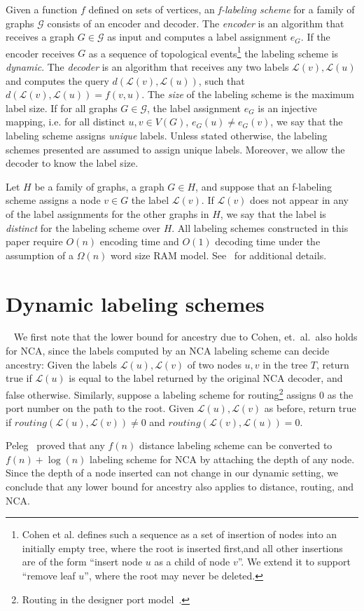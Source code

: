 \documentclass{llncs}
\newcommand{\la}{\ensuremath{ \mathcal{L}}}
\newcommand{\drop}[1]{}
\begin{document}
	Given a function $f$ defined on sets of vertices,
	 an  \emph{ f-labeling scheme} for a family of graphs $\mathcal{G}$ consists   of  an encoder  and decoder.
	The  \emph{encoder}  is an algorithm that receives a graph $G \in
    \mathcal{G}$ as input and  computes a label assignment $e_G$. If the encoder receives $G$ as a sequence of topological events\footnote{Cohen et al. defines such a sequence as  a set of insertion of nodes into an initially empty tree, where the root is inserted first,and all other insertions are of the form ``insert node $u$ as a child of node $v$''.  We extend it to support ``remove leaf $u$'', where the root may never be deleted. } the labeling scheme is \emph{dynamic}.
	 The \emph{decoder}  is an algorithm  that receives any two labels $\la(v),\la(u)$  and  computes the query $d(\la(v),\la(u))$, such that  $d(\la(v),\la(u))=f(v,u)$. The \emph{size} of the labeling scheme is the maximum label size.
	 If for all graphs  $ G \in \mathcal{G}$, the label assignment  $e_G$ is an injective mapping, i.e. for all distinct $u,v \in V(G)$, $e_G(u) \neq e_G(v) $, we say that the labeling scheme assigns \emph{unique} labels. Unless stated otherwise, the labeling schemes presented are assumed to assign unique labels. Moreover, we allow the decoder to know the label size.

	 Let $H$ be a family of graphs, a graph $G \in H$, and suppose that an f-labeling scheme assigns a node $v \in G$ the label $\la(v)$.
	  If $\la(v)$ does not appear in any of the label assignments for the other graphs in $H$, we say that the label is \emph{distinct} for the labeling scheme over $H$.
All labeling schemes constructed in this paper require $O(n)$ encoding time and $O(1)$ decoding time under the assumption of a $\Omega(n)$ word size RAM model. See~\cite{Thorup01} for additional details.

\section{Dynamic labeling schemes}~\label{Sec:Dynamic}
We first note that the lower bound for ancestry due to Cohen, et.~al.~also
holds for NCA, since the labels computed by an NCA labeling scheme can decide ancestry:
Given the labels  $\la(u),\la(v)$ of two nodes $u,v$ in the tree $T$,  return
true if $\la(u)$ is equal to the label returned by the original NCA decoder, and
false otherwise.
Similarly, suppose a labeling scheme for routing\footnote{Routing in the
designer port model~\cite{Fraigniaud01}.} assigns $0$ as the port number on the
path to the root. Given  $\la(u),\la(v)$  as before, return true if
$routing(\la(u),\la(v)) \neq 0$ and $ routing(\la(v), \la(u)) =0$.
\drop{If there were to exist a dynamic labeling scheme for routing or NCA with
size $o(n)$, the labels produced would be sufficient to determine ancestry,
in contrast to Cohen's bound.}
Peleg~\cite{Peleg05} proved that any $f(n)$ distance labeling scheme can be
converted to $f(n)+\log (n)$ labeling scheme for NCA by  attaching the
depth of any node. Since the depth of a node inserted can not change in our
dynamic setting, we conclude that any lower
bound for ancestry also applies to distance, routing, and NCA.
\end{document}
